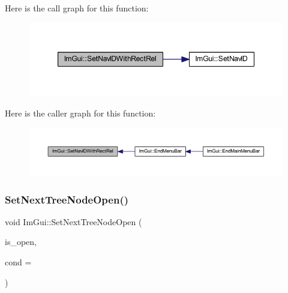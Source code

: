 Here is the call graph for this function\+:
\nopagebreak
\begin{figure}[H]
\begin{center}
\leavevmode
\includegraphics[width=347pt]{namespace_im_gui_a91892871e19fba553a0f81e2cc49b0d3_cgraph}
\end{center}
\end{figure}
Here is the caller graph for this function\+:
\nopagebreak
\begin{figure}[H]
\begin{center}
\leavevmode
\includegraphics[width=350pt]{namespace_im_gui_a91892871e19fba553a0f81e2cc49b0d3_icgraph}
\end{center}
\end{figure}
\mbox{\label{namespace_im_gui_ab9a0c20b04a753449494fb20ec2e0e87}} 
\subsubsection{\texorpdfstring{Set\+Next\+Tree\+Node\+Open()}{SetNextTreeNodeOpen()}}
{\footnotesize\ttfamily void Im\+Gui\+::\+Set\+Next\+Tree\+Node\+Open (\begin{DoxyParamCaption}\item[{bool}]{is\+\_\+open,  }\item[{\mbox{\hyperlink{imgui_8h_aef890d6ac872e12c5804d0b3e4f7f103}{Im\+Gui\+Cond}}}]{cond = {} }\end{DoxyParamCaption})}

\mbox{\label{namespace_im_gui_a7de5a63cec4babe417f972403db6430c}} 
